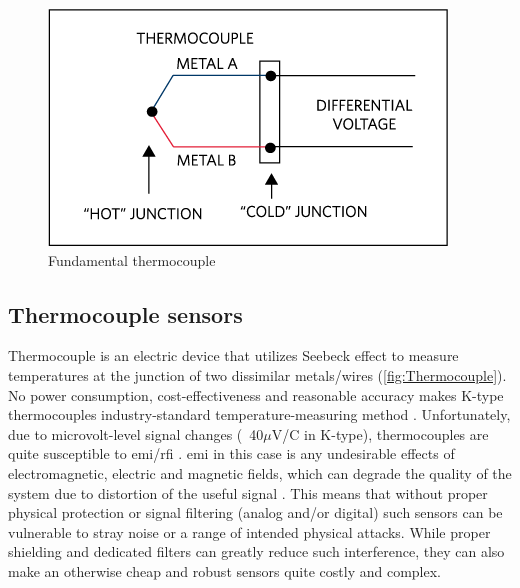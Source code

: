 \begin{figure} [h]
    \centering
    \includegraphics[width=\linewidth]{pictures/TC.png}
    \caption{Fundamental thermocouple \cite{Ismail17}}
    \label{fig:TCouple}
\end{figure}

\subsection{Thermocouple sensors}

Thermocouple is an electric device that utilizes Seebeck effect to measure temperatures at the junction of two dissimilar metals/wires (\cref{fig:Thermocouple}). No power consumption, cost-effectiveness and reasonable accuracy makes K-type thermocouples industry-standard temperature-measuring method \cite{Duff10}. Unfortunately, due to microvolt-level signal changes (~40$\mu$V/\textdegree{}C in K-type), thermocouples are quite susceptible to \ac{emi}/\ac{rfi} \cite{Smalcerz2013,Astm93}. \ac{emi} in this case is any undesirable effects of electromagnetic, electric and magnetic fields, which can degrade the quality of the system due to distortion of the useful signal \cite{Getz96}. This means that without proper physical protection or signal filtering (analog and/or digital) such sensors can be vulnerable to stray noise or a range of intended physical attacks. While proper shielding and dedicated filters can greatly reduce such interference, they can also make an otherwise cheap and robust sensors quite costly and complex. 

